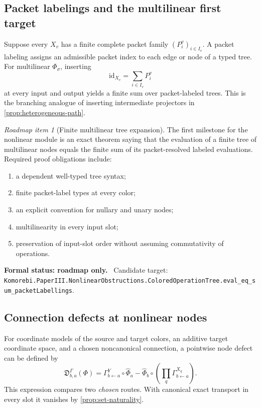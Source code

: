 \documentclass[11pt]{article}
\theoremstyle{definition}
\theoremstyle{remark}
\newtheorem{roadmap}[theorem]{Roadmap item}
\newcommand{\id}{\mathrm{id}}
\newcommand{\leanname}[1]{\nolinkurl{#1}}
\newcommand{\statusroadmap}[1]{%
  \par\smallskip\noindent
  {\color{roadmapgray}\textbf{Formal status: roadmap only.}}
  \ #1\par\smallskip}
\begin{document}
\subsection{Packet labelings and the multilinear first target}

Suppose every $X_v$ has a finite complete packet family
$(P^v_i)_{i\in I_v}$.  A packet labeling assigns an admissible packet index
to each edge or node of a typed tree.  For multilinear $\Phi_\sigma$, inserting
\[
\id_{X_v}=\sum_{i\in I_v}P^v_i
\]
at every input and output yields a finite sum over packet-labeled trees.
This is the branching analogue of inserting intermediate projectors in
\cref{prop:heterogeneous-path}.

\begin{roadmap}[Finite multilinear tree expansion]
\label{roadmap:multilinear-tree}
The first milestone for the nonlinear module is an exact theorem saying that the
evaluation of a finite tree of multilinear nodes equals the finite sum of its
packet-resolved labeled evaluations.  Required proof obligations include:
\begin{enumerate}[label=(\alph*)]
\item a dependent well-typed tree syntax;
\item finite packet-label types at every color;
\item an explicit convention for nullary and unary nodes;
\item multilinearity in every input slot;
\item preservation of input-slot order without assuming commutativity of
operations.
\end{enumerate}
\end{roadmap}
\statusroadmap{Candidate target: \leanname{Komorebi.PaperIII.NonlinearObstructions.ColoredOperationTree.eval_eq_sum_packetLabellings}.}

\subsection{Connection defects at nonlinear nodes}

For coordinate models of the source and target colors, an additive target
coordinate space, and a chosen noncanonical connection, a pointwise node
defect can be defined by
\[
\mathfrak D^\Gamma_{b,a}(\Phi)
=
\Gamma^Y_{b\leftarrow a}\circ\widehat\Phi_a
-
\widehat\Phi_b\circ
\left(\prod_q\Gamma^{X_q}_{b\leftarrow a}\right).
\]
This expression compares two \emph{chosen} routes.  With canonical exact
transport in every slot it vanishes by \cref{prop:set-naturality}.
\end{document}
